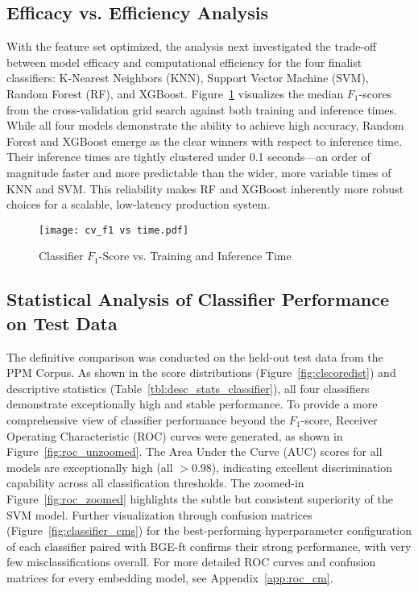 \subsection{Efficacy vs. Efficiency Analysis}\label{ch:4.5.2}
With the feature set optimized, the analysis next investigated the trade-off between model efficacy and computational efficiency for the four finalist classifiers: K-Nearest Neighbors (KNN), Support Vector Machine (SVM), Random Forest (RF), and XGBoost. Figure~\ref{fig:f1time} visualizes the median \(F_1\)-scores from the cross-validation grid search against both training and inference times.  While all four models demonstrate the ability to achieve high accuracy, Random Forest and XGBoost emerge as the clear winners with respect to inference time.  Their inference times are tightly clustered under 0.1 seconds---an order of magnitude faster and more predictable than the wider, more variable times of KNN and SVM.  This reliability makes RF and XGBoost inherently more robust choices for a scalable, low-latency production system.
\begin{figure}[tb]
    \captionsetup{skip=5pt}
    \centering
    \texttt{[image: cv\_f1 vs time.pdf]}
    \caption{Classifier \(F_1\)-Score vs. Training and Inference Time}
    \label{fig:f1time}
\end{figure}

\subsection{Statistical Analysis of Classifier Performance on Test Data}\label{ch:4.5.3}
The definitive comparison was conducted on the held-out test data from the PPM Corpus. As shown in the score distributions (Figure~\ref{fig:clscoredist}) and descriptive statistics (Table~\ref{tbl:desc_stats_classifier}), all four classifiers demonstrate exceptionally high and stable performance. To provide a more comprehensive view of classifier performance beyond the \(F_1\)-score, Receiver Operating Characteristic (ROC) curves were generated, as shown in Figure~\ref{fig:roc_unzoomed}. The Area Under the Curve (AUC) scores for all models are exceptionally high (all \(>0.98\)), indicating excellent discrimination capability across all classification thresholds. The zoomed-in Figure~\ref{fig:roc_zoomed} highlights the subtle but consistent superiority of the SVM model. Further visualization through confusion matrices (Figure~\ref{fig:classifier_cms}) for the best-performing hyperparameter configuration of each classifier paired with BGE-ft confirms their strong performance, with very few misclassifications overall. For more detailed ROC curves and confusion matrices for every embedding model, see Appendix~\ref{app:roc_cm}.

